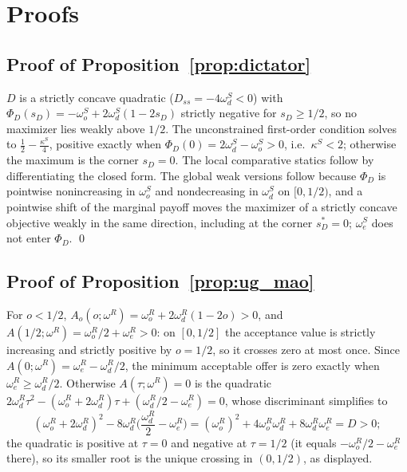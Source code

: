 \documentclass[11pt]{article}
\theoremstyle{plain}
\theoremstyle{remark}
\begin{document}
\clearpage
\setcounter{section}{0}
\renewcommand{\thesection}{II.\Alph{section}}
\section{Proofs}
\label{app:proofs_disparity}

\subsection*{Proof of Proposition~\ref{prop:dictator}}

$D$ is a strictly concave quadratic ($D_{ss}=-4\omega_d^S<0$) with $\Phi_D(s_D)=-\omega_o^S+2\omega_d^S(1-2s_D)$ strictly negative for $s_D\ge1/2$, so no maximizer lies weakly above $1/2$.  The unconstrained first-order condition solves to $\tfrac12-\tfrac{\kappa^S}4$, positive exactly when $\Phi_D(0)=2\omega_d^S-\omega_o^S>0$, i.e.\ $\kappa^S<2$; otherwise the maximum is the corner $s_D=0$.  The local comparative statics follow by differentiating the closed form.  The global weak versions follow because $\Phi_D$ is pointwise nonincreasing in $\omega_o^S$ and nondecreasing in $\omega_d^S$ on $[0,1/2)$, and a pointwise shift of the marginal payoff moves the maximizer of a strictly concave objective weakly in the same direction, including at the corner $s_D^\ast=0$; $\omega_e^S$ does not enter $\Phi_D$.
\qed

\subsection*{Proof of Proposition~\ref{prop:ug_mao}}

For $o<1/2$, $A_o(o;\omega^R)=\omega_o^R+2\omega_d^R(1-2o)>0$, and $A(1/2;\omega^R)=\omega_o^R/2+\omega_e^R>0$: on $[0,1/2]$ the acceptance value is strictly increasing and strictly positive by $o=1/2$, so it crosses zero at most once.  Since $A(0;\omega^R)=\omega_e^R-\omega_d^R/2$, the minimum acceptable offer is zero exactly when $\omega_e^R\ge\omega_d^R/2$.  Otherwise $A(\tau;\omega^R)=0$ is the quadratic $2\omega_d^R\tau^2-(\omega_o^R+2\omega_d^R)\tau+(\omega_d^R/2-\omega_e^R)=0$, whose discriminant simplifies to
\[
        (\omega_o^R+2\omega_d^R)^2-8\omega_d^R\Big(\frac{\omega_d^R}{2}-\omega_e^R\Big)
        =
        (\omega_o^R)^2+4\omega_o^R\omega_d^R+8\omega_d^R\omega_e^R=D>0;
\]
the quadratic is positive at $\tau=0$ and negative at $\tau=1/2$ (it equals $-\omega_o^R/2-\omega_e^R$ there), so its smaller root is the unique crossing in $(0,1/2)$, as displayed.
\end{document}
